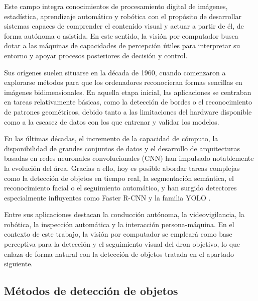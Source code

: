 \vspace{0.3cm}

Este campo integra conocimientos de procesamiento digital de imágenes, estadística, aprendizaje automático y robótica con el propósito de desarrollar sistemas capaces de comprender el contenido visual y actuar a partir de él, de forma autónoma o asistida. En este sentido, la visión por computador busca dotar a las máquinas de capacidades de percepción útiles para interpretar su entorno y apoyar procesos posteriores de decisión y control.

\vspace{0.3cm}

Sus orígenes suelen situarse en la década de 1960, cuando comenzaron a explorarse métodos para que los ordenadores reconocieran formas sencillas en imágenes bidimensionales. En aquella etapa inicial, las aplicaciones se centraban en tareas relativamente básicas, como la detección de bordes o el reconocimiento de patrones geométricos, debido tanto a las limitaciones del hardware disponible como a la escasez de datos con los que entrenar y validar los modelos.

\vspace{0.3cm}

En las últimas décadas, el incremento de la capacidad de cómputo, la disponibilidad de grandes conjuntos de datos y el desarrollo de arquitecturas basadas en redes neuronales convolucionales (CNN) han impulsado notablemente la evolución del área. Gracias a ello, hoy es posible abordar tareas complejas como la detección de objetos en tiempo real, la segmentación semántica, el reconocimiento facial o el seguimiento automático, y han surgido detectores especialmente influyentes como Faster R-CNN y la familia YOLO \cite{FunRcnn}.

\vspace{0.3cm}

Entre sus aplicaciones destacan la conducción autónoma, la videovigilancia, la robótica, la inspección automática y la interacción persona-máquina. En el contexto de este trabajo, la visión por computador se empleará como base perceptiva para la detección y el seguimiento visual del dron objetivo, lo que enlaza de forma natural con la detección de objetos tratada en el apartado siguiente.

\vspace{0.3cm}

\subsection{Métodos de detección de objetos}


